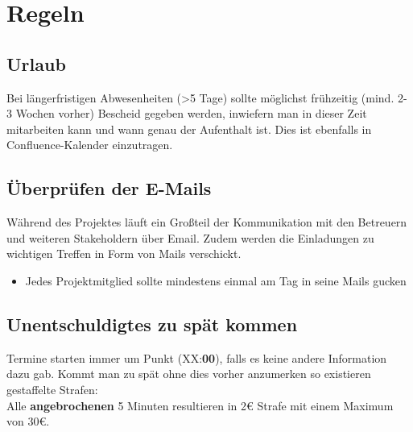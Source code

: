 \section{Regeln}
\subsection{Urlaub}
Bei längerfristigen Abwesenheiten (>5 Tage) sollte möglichst frühzeitig (mind. 2-3 Wochen vorher) Bescheid gegeben werden, inwiefern man in dieser Zeit mitarbeiten kann und wann genau der Aufenthalt ist. Dies ist ebenfalls in Confluence-Kalender einzutragen.

\subsection{Überprüfen der E-Mails}
Während des Projektes läuft ein Großteil der Kommunikation mit den Betreuern und weiteren Stakeholdern über Email. Zudem werden die Einladungen zu wichtigen Treffen in Form von Mails verschickt.
\begin{itemize}
	\item Jedes Projektmitglied sollte mindestens einmal am Tag in seine Mails gucken	
\end{itemize}

\subsection{Unentschuldigtes zu spät kommen}
Termine starten immer um Punkt (XX:\textbf{00}), falls es keine andere Information dazu gab. Kommt man zu spät ohne dies vorher anzumerken so existieren gestaffelte Strafen: \\
Alle \textbf{angebrochenen} 5 Minuten resultieren in 2\euro{} Strafe mit einem Maximum von 30\euro{}.

